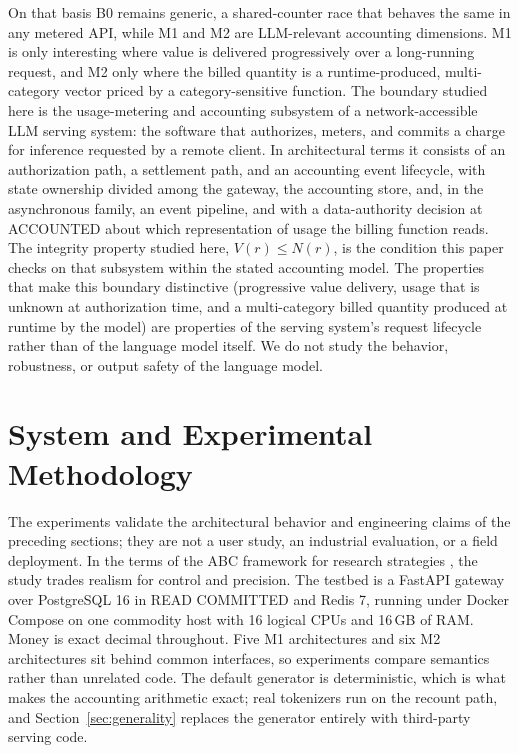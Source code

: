 \documentclass[preprint,3p,authoryear,12pt]{elsarticle}
\begin{document}
On that basis B0 remains generic, a shared-counter race that behaves the same in any
metered API, while M1 and M2 are LLM-relevant accounting dimensions. M1 is only
interesting where value is delivered progressively over a long-running request, and M2
only where the billed quantity is a runtime-produced, multi-category vector priced by a
category-sensitive function. The boundary studied here is the usage-metering and
accounting subsystem of a network-accessible LLM serving system: the software that
authorizes, meters, and commits a charge for inference requested by a remote client. In
architectural terms it consists of an authorization path, a settlement path, and an
accounting event lifecycle, with state ownership divided among the gateway, the
accounting store, and, in the asynchronous family, an event pipeline, and with a
data-authority decision at ACCOUNTED about which representation of usage the billing
function reads. The integrity property studied here, $V(r) \le N(r)$, is the condition
this paper checks on that subsystem within the stated accounting model. The properties that make this
boundary distinctive (progressive value delivery, usage that is unknown at
authorization time, and a multi-category billed quantity produced at runtime by the
model) are properties of the serving system's request lifecycle rather than of the
language model itself. We do not study the behavior, robustness, or output safety of the
language model.

\section{System and Experimental Methodology}
\label{sec:method}
The experiments validate the architectural behavior and engineering claims of the
preceding sections; they are not a user study, an industrial evaluation, or a field
deployment. In the terms of the ABC framework for research strategies \citep{abc}, the
study trades realism for control and precision. The testbed is a FastAPI gateway over PostgreSQL 16 in READ COMMITTED and Redis 7,
running under Docker Compose on one commodity host with 16 logical CPUs and 16\,GB of
RAM. Money is exact decimal throughout. Five M1 architectures and six M2 architectures
sit behind common interfaces, so experiments compare semantics rather than unrelated
code. The default generator is deterministic, which is what makes the accounting
arithmetic exact; real tokenizers run on the recount path, and
Section~\ref{sec:generality} replaces the generator entirely with third-party serving
code.
\end{document}
